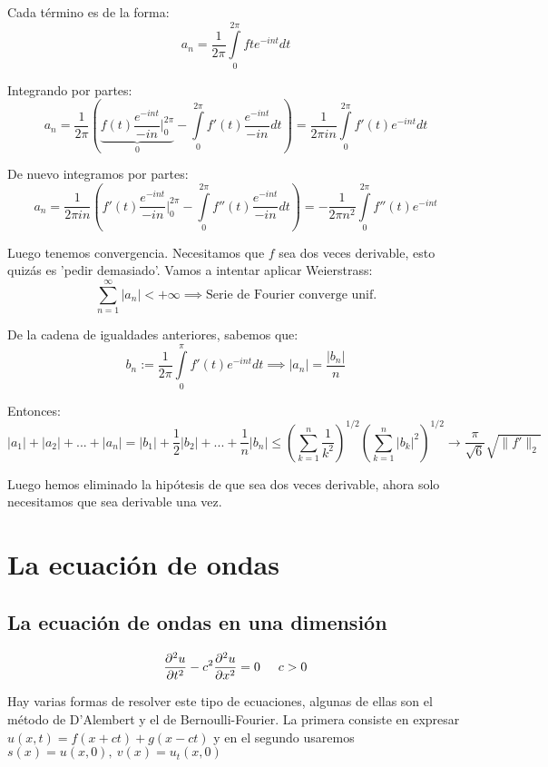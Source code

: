 \documentclass[openany]{book}
\begin{document}
\begin{demonstration}
  Cada término es de la forma:
  $$ a_n = \dfrac{1}{2\pi} \int\limits_{0}^{2\pi} fte^{-int}dt $$

  Integrando por partes:
  $$ a_n = \dfrac{1}{2\pi} \left( \underbrace{f(t)\dfrac{e^{-int}}{-in}\Biggr|_{0}^{2\pi} }_{0} - \int\limits_{0}^{2\pi}f'(t) \dfrac{e^{-int}}{-in}dt\right) = \dfrac{1}{2\pi i n} \int\limits_{0}^{2\pi}f'(t)e^{-int}dt  $$

  De nuevo integramos por partes:
  $$ a_n = \dfrac{1}{2\pi i n} \left( f'(t) \dfrac{e^{-int}}{-in} \Biggr|_{0}^{2\pi} - \int\limits_{0}^{2\pi}f''(t)\dfrac{e^{-int}}{-in}dt \right) = -\dfrac{1}{2\pi n^2} \int\limits_{0}^{2\pi}f''(t) e^{-int} $$

  Luego tenemos convergencia. Necesitamos que $ f $ sea dos veces derivable, esto quizás es 'pedir demasiado'. Vamos a intentar aplicar Weierstrass:
  $$ \sum\limits_{n=1}^{\infty} |a_n| < +\infty \implies \text{Serie de Fourier converge unif.} $$

  De la cadena de igualdades anteriores, sabemos que:
  $$ b_n := \dfrac{1}{2\pi} \int\limits_{0}^{\pi}f'(t)e^{-int}dt \implies |a_n| = \dfrac{|b_n|}{n} $$

  Entonces:
  $$ |a_1|+|a_2|+...+|a_n| = |b_1|+\dfrac{1}{2}|b_2|+...+\dfrac{1}{n}|b_n| \leq  \left( \sum\limits_{k=1}^{n} \dfrac{1}{k^2} \right) ^{1/2} \left( \sum\limits_{k=1}^{n} |b_k|^2 \right)^{1/2} \to \dfrac{\pi}{\sqrt{6}}\sqrt{\|f'\|_{2}} $$

  Luego hemos eliminado la hipótesis de que sea dos veces derivable, ahora solo necesitamos que sea derivable una vez.

  

\end{demonstration}




\chapter{La ecuación de ondas}

\section{La ecuación de ondas en una dimensión}

$$ \dfrac{\partial ^2 u}{\partial t^2}- c^2 \dfrac{\partial ^2 u}{\partial x ^2} = 0 \hspace{5mm} c>0 $$

Hay varias formas de resolver este tipo de ecuaciones, algunas de ellas son el método de D'Alembert y el de Bernoulli-Fourier. La primera consiste en expresar $ u(x,t) = f(x+ct) + g(x-ct) $ y en el segundo usaremos $ s(x) = u(x,0),\ v(x)=u_{t}(x,0) $
\end{document}
